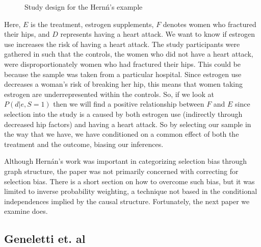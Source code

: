 \documentclass[12pt,twoside]{reedthesis}
\theoremstyle{definition}
\begin{document}
\begin{figure}[H]
\begin{center}
\end{center}
\caption{Study design for the Hern\'n's example}
\end{figure}

Here, $E$ is the treatment, estrogen supplements, $F$ denotes women who fractured their hips, and $D$ represents having a heart attack. We want to know if estrogen use increases the risk of having a heart attack. The study participants were gathered in such that the controls, the women who did not have a heart attack, were disproportionately women who had fractured their hips. This could be because the sample was taken from a particular hospital. Since estrogen use decreases a woman's risk of breaking her hip, this means that women taking estrogen are underrepresented within the controls. So, if we look at $P(d | e, S = 1)$ then we will find a positive relationship between $F$ and $E$ since selection into the study is a caused by both estrogen use (indirectly through decreased hip factors) and having a heart attack. So by selecting our sample in the way that we have, we have conditioned on a common effect of both the treatment and the outcome, biasing our inferences. 

Although Hern\'an's work was important in categorizing selection bias through graph structure, the paper was not primarily concerned with correcting for selection bias. There is a short section on how to overcome such bias, but it was limited to inverse probability weighting, a technique not based in the conditional independences implied by the causal structure. Fortunately, the next paper we examine does. 



\subsection{Geneletti et. al}
\end{document}
